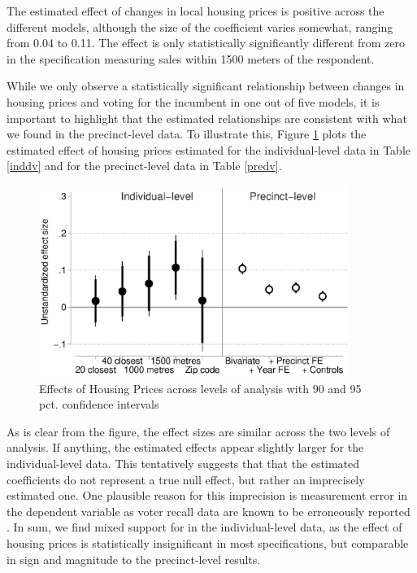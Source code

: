 \documentclass[12pt,a4paper]{article}
\begin{document}
	
	
	The estimated effect of changes in local housing prices is positive across the different models, although the size of the coefficient varies somewhat, ranging from 0.04 to 0.11. The effect is only statistically significantly different from zero in the specification measuring sales within 1500 meters of the respondent.
	
	While we only observe a statistically significant relationship between changes in housing prices and voting for the incumbent in one out of five models, it is important to highlight that the estimated relationships are consistent with what we found in the precinct-level data. To illustrate this, Figure \ref{comparison} plots the estimated effect of housing prices estimated for the individual-level data in Table \ref{inddv} and for the precinct-level data in Table \ref{predv}.
	
	\begin{figure}[htbp!]
		\includegraphics[width=0.9\textwidth]{../figures/comparison.eps}
		\centering
		\caption{Effects of Housing Prices across levels of analysis with 90 and 95 pct. confidence intervals}\label{comparison}
	\end{figure}
	
	As is clear from the figure, the effect sizes are similar across the two levels of analysis. If anything, the estimated effects appear slightly larger for the individual-level data. This tentatively suggests that that the estimated coefficients do not represent a true null effect, but rather an imprecisely estimated one. One plausible reason for this imprecision is measurement error in the dependent variable as voter recall data are known to be erroneously reported \citep[e.g.,][]{bernstein2001overreporting}. In sum, we find mixed support for \hone in the individual-level data, as the effect of housing prices is statistically insignificant in most specifications, but comparable in sign and magnitude to the precinct-level results.
	
\end{document}
